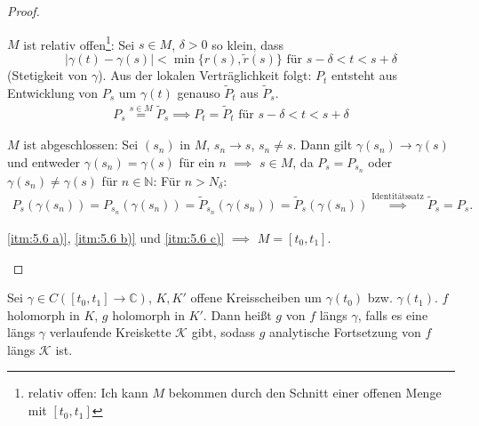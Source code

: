 \begin{theorem}[Satz]
\begin{proof}
\begin{enum-arab}
\begin{enum-arab}
        \item \label{itm:5.6 b)} $M$ ist relativ offen\footnote{relativ offen: Ich kann $M$ bekommen durch den Schnitt einer offenen Menge mit $[t_0,t_1]$}: Sei $s \in M$, $\delta > 0$ so klein, dass \[|\gamma(t) - \gamma(s)| < \min\{r(s),\widetilde{r}(s)\} \text{ für } s - \delta < t < s + \delta\] (Stetigkeit von $\gamma$). Aus der lokalen Verträglichkeit folgt: $P_t$ entsteht aus Entwicklung von $P_s$ um $\gamma(t)$ genauso $\widetilde{P}_t$ aus $\widetilde{P}_s$.
        \begin{align*}
          P_s \overset{s \in M}{=} \widetilde{P}_s \implies P_t = \widetilde{P}_t \text{ für } s - \delta < t < s + \delta
        \end{align*}
        
        \item \label{itm:5.6 c)} $M$ ist abgeschlossen: Sei $(s_n)$ in $M$, $s_n \to s$, $s_n \neq s$. Dann gilt $\gamma(s_n) \to \gamma(s)$ und entweder $\gamma(s_n) = \gamma(s)$ für ein $n$ $\implies$ $s \in M$, da $P_s = P_{s_n}$ oder $\gamma(s_n) \neq \gamma(s)$ für $n \in \mathbb{N}$: Für $n > N_\delta$: 
        \begin{align*}
          P_s(\gamma(s_n)) = P_{s_n}(\gamma(s_n)) = \widetilde{P}_{s_n}(\gamma(s_n)) = \widetilde{P}_s(\gamma(s_n))
          \overset{\text{Identitätssatz}}{\implies} \widetilde{P}_s = P_s .
        \end{align*}
      \end{enum-arab}
      \ref{itm:5.6 a)}, \ref{itm:5.6 b)} und \ref{itm:5.6 c)} $\implies$ $M = [t_0,t_1]$.
    \end{enum-arab}
  \end{proof}
\end{theorem}

\begin{theorem}[Definition]
  Sei $\gamma \in C([t_0,t_1] \to \mathbb{C})$, $K,K'$ offene Kreisscheiben um $\gamma(t_0)$ bzw. $\gamma(t_1)$. $f$ holomorph in $K$, $g$ holomorph in $K'$. Dann heißt $g$  von $f$ längs $\gamma$, falls es eine längs $\gamma$ verlaufende Kreiskette $\mathcal{K}$ gibt, sodass $g$ analytische Fortsetzung von $f$ längs $\mathcal{K}$ ist.
\end{theorem}

